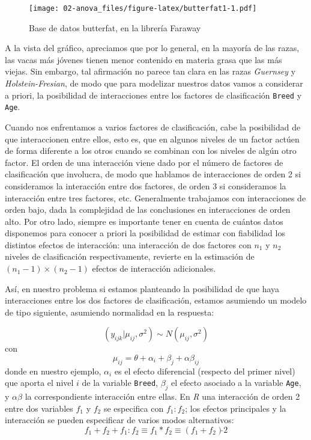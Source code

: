 \documentclass[
]{book}
\begin{document}
\begin{figure}
\centering
\texttt{[image: 02-anova\_files/figure-latex/butterfat1-1.pdf]}
\caption{\label{fig:butterfat1}Base de datos butterfat, en la librería Faraway}
\end{figure}

A la vista del gráfico, apreciamos que por lo general, en la mayoría de las razas, las vacas más jóvenes tienen menor contenido en materia grasa que las más viejas. Sin embargo, tal afirmación no parece tan clara en las razas \emph{Guernsey} y \emph{Holstein-Fresian}, de modo que para modelizar nuestros datos vamos a considerar a priori, la posibilidad de interacciones entre los factores de clasificación \texttt{Breed} y \texttt{Age}.

Cuando nos enfrentamos a varios factores de clasificación, cabe la posibilidad de que interaccionen entre ellos, esto es, que en algunos niveles de un factor actúen de forma diferente a los otros cuando se combinan con los niveles de algún otro factor. El orden de una interacción viene dado por el número de factores de clasificación que involucra, de modo que hablamos de interacciones de orden 2 si consideramos la interacción entre dos factores, de orden 3 si consideramos la interacción entre tres factores, etc. Generalmente trabajamos con interacciones de orden bajo, dada la complejidad de las conclusiones en interacciones de orden alto. Por otro lado, siempre es importante tener en cuenta de cuántos datos disponemos para conocer a priori la posibilidad de estimar con fiabilidad los distintos efectos de interacción: una interacción de dos factores con \(n_1\) y \(n_2\) niveles de clasificación respectivamente, revierte en la estimación de \((n_1-1)\times(n_2-1)\) efectos de interacción adicionales.

Así, en nuestro problema si estamos planteando la posibilidad de que haya interacciones entre los dos factores de clasificación, estamos asumiendo un modelo de tipo siguiente, asumiendo normalidad en la respuesta:

\[(y_{ijk}|\mu_{ij},\sigma^2) \sim N(\mu_{ij},\sigma^2)\]
con
\[\mu_{ij}=\theta+ \alpha_i + \beta_j + \alpha\beta_{ij}\]
donde en nuestro ejemplo, \(\alpha_i\) es el efecto diferencial (respecto del primer nivel) que aporta el nivel \(i\) de la variable \texttt{Breed}, \(\beta_j\) el efecto asociado a la variable \texttt{Age}, y \(\alpha\beta\) la correspondiente interacción entre ellas. En \emph{R} una interacción de orden 2 entre dos variables \(f_1\) y \(f_2\) se especifica con \(f_1:f_2\); los efectos principales y la interacción se pueden especificar de varios modos alternativos:
\[f_1+f_2+f_1:f_2 \equiv f_1*f_2 \equiv (f_1+f_2)\hat{} 2\]
\end{document}
